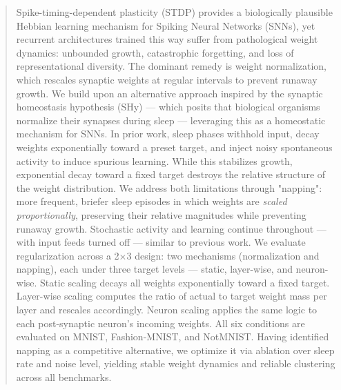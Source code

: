 \documentclass[runningheads]{llncs}
\begin{document}
\begin{abstract}
Spike-timing-dependent plasticity (STDP) provides a biologically plausible Hebbian learning mechanism for Spiking Neural Networks (SNNs), yet recurrent architectures trained this way suffer from pathological weight dynamics: unbounded growth, catastrophic forgetting, and loss of representational diversity. The dominant remedy is weight normalization, which rescales synaptic weights at regular intervals to prevent runaway growth. We build upon an alternative approach inspired by the synaptic homeostasis hypothesis (SHy) — which posits that biological organisms normalize their synapses during sleep — leveraging this as a homeostatic mechanism for SNNs. In prior work, sleep phases withhold input, decay weights exponentially toward a preset target, and inject noisy spontaneous activity to induce spurious learning. While this stabilizes growth, exponential decay toward a fixed target destroys the relative structure of the weight distribution.
We address both limitations through "napping": more frequent, briefer sleep episodes in which weights are \textit{scaled proportionally}, preserving their relative magnitudes while preventing runaway growth. Stochastic activity and learning continue throughout — with input feeds turned off — similar to previous work.
We evaluate regularization across a 2×3 design: two mechanisms (normalization and napping), each under three target levels — static, layer-wise, and neuron-wise. Static scaling decays all weights exponentially toward a fixed target. Layer-wise scaling computes the ratio of actual to target weight mass per layer and rescales accordingly. Neuron scaling applies the same logic to each post-synaptic neuron's incoming weights. All six conditions are evaluated on MNIST, Fashion-MNIST, and NotMNIST.
Having identified napping as a competitive alternative, we optimize it via ablation over sleep rate and noise level, yielding stable weight dynamics and reliable clustering across all benchmarks.

\end{abstract}
%
%
%
\end{document}

